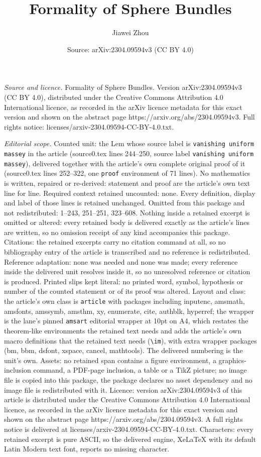\documentclass[10pt,a4paper]{amsart}
\title[Formality of Sphere Bundles]{Formality of Sphere Bundles}
\author{Jiawei Zhou}
\date{Source: arXiv:2304.09594v3 (CC BY 4.0)}
\begin{document}
\maketitle

\noindent\emph{Source and licence.} Formality of Sphere Bundles. Version arXiv:2304.09594v3 (CC BY 4.0), distributed under the Creative Commons Attribution 4.0 International licence, as recorded in the arXiv licence metadata for this exact version and shown on the abstract page https://arxiv.org/abs/2304.09594v3. Full rights notice: licenses/arxiv-2304.09594-CC-BY-4.0.txt.\par\smallskip

\noindent\textit{Editorial scope.} Counted unit: the Lem whose source label is \texttt{vanishing uniform massey} in the article (source0.tex lines 244--250, source label \texttt{vanishing uniform massey}), delivered together with the article's own complete original proof of it (source0.tex lines 252--322, one \texttt{proof} environment of 71 lines). No mathematics is written, repaired or re-derived: statement and proof are the article's own text line for line. Required context retained uncounted: none. Every definition, display and label of those lines is retained unchanged. Omitted from this package and not redistributed: 1--243, 251--251, 323--608. Nothing inside a retained excerpt is omitted or altered: every retained body is delivered exactly as the article's lines are written, so no omission receipt of any kind accompanies this package. Citations: the retained excerpts carry no citation command at all, so no bibliography entry of the article is transcribed and no reference is redistributed. Reference adaptation: none was needed and none was made; every reference inside the delivered unit resolves inside it, so no unresolved reference or citation is produced. Printed slips kept literal: no printed word, symbol, hypothesis or number of the counted statement or of its proof was altered. Layout and class: the article's own class is \texttt{article} with packages including inputenc, amsmath, amsfonts, amssymb, amsthm, xy, enumerate, cite, authblk, hyperref; the wrapper is the lane's pinned \texttt{amsart} editorial wrapper at 10pt on A4, which restates the theorem-like environments the retained text needs and adds the article's own macro definitions that the retained text needs (\texttt{\textbackslash im}), with extra wrapper packages (bm, bbm, dsfont, xspace, cancel, mathtools). The delivered numbering is the unit's own. Assets: no retained span contains a figure environment, a graphics-inclusion command, a PDF-page inclusion, a table or a TikZ picture; no image file is copied into this package, the package declares no asset dependency and no image file is redistributed with it. Licence: version arXiv:2304.09594v3 of this article is distributed under the Creative Commons Attribution 4.0 International licence, as recorded in the arXiv licence metadata for this exact version and shown on the abstract page https://arxiv.org/abs/2304.09594v3. A full rights notice is delivered at licenses/arxiv-2304.09594-CC-BY-4.0.txt. Characters: every retained excerpt is pure ASCII, so the delivered engine, XeLaTeX with its default Latin Modern text font, reports no missing character.
\end{document}
